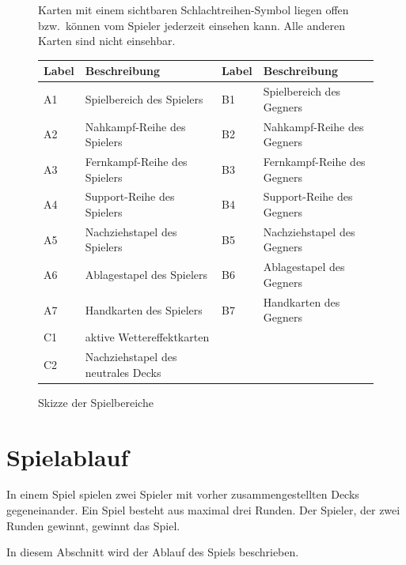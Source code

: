 \documentclass[a4paper,11pt]{report}
\begin{document}
\begin{figure}
\begin{center}
\begin{center}
\end{center}
\caption{Skizze der Spielbereiche}\label{fig:Spiel}
Karten mit einem sichtbaren Schlachtreihen-Symbol liegen offen bzw.\ können vom Spieler jederzeit einsehen kann. Alle anderen Karten sind nicht einsehbar.
\end{center}
\begin{tabular}{l|l||l|l}
Label & Beschreibung & Label & Beschreibung \\ \hline
A1 & Spielbereich des Spielers & B1 & Spielbereich des Gegners\\
A2 & Nahkampf-Reihe des Spielers & B2 & Nahkampf-Reihe des Gegners \\
A3 & Fernkampf-Reihe des Spielers & B3 & Fernkampf-Reihe des Gegners \\
A4 & Support-Reihe des Spielers & B4 & Support-Reihe des Gegners \\
A5 & Nachziehstapel des Spielers & B5 & Nachziehstapel des Gegners \\
A6 & Ablagestapel des Spielers & B6 & Ablagestapel des Gegners \\
A7 & Handkarten des Spielers & B7 & Handkarten des Gegners \\ 
C1 & aktive Wettereffektkarten & & \\
C2 & Nachziehstapel des neutrales Decks & &
\end{tabular}

\end{figure}

\section{Spielablauf}
In einem Spiel spielen zwei Spieler mit vorher zusammengestellten Decks gegeneinander.
Ein Spiel besteht aus maximal drei Runden. Der Spieler, der zwei Runden gewinnt, gewinnt das Spiel.

In diesem Abschnitt wird der Ablauf des Spiels beschrieben. 
\end{document}
